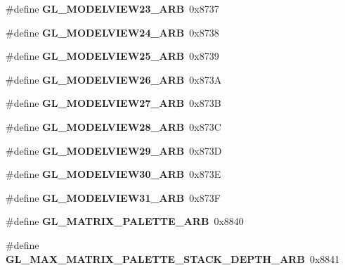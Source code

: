 \begin{DoxyCompactItemize}
\item 
\#define {\bfseries G\+L\+\_\+\+M\+O\+D\+E\+L\+V\+I\+E\+W23\+\_\+\+A\+R\+B}~0x8737\label{_s_d_l__opengl_8h_ae8cd306e49a5b92831d43f1c62419ae6}

\item 
\#define {\bfseries G\+L\+\_\+\+M\+O\+D\+E\+L\+V\+I\+E\+W24\+\_\+\+A\+R\+B}~0x8738\label{_s_d_l__opengl_8h_ae244b71b4055a0fd37b5674ae193839d}

\item 
\#define {\bfseries G\+L\+\_\+\+M\+O\+D\+E\+L\+V\+I\+E\+W25\+\_\+\+A\+R\+B}~0x8739\label{_s_d_l__opengl_8h_aabe837230691b8591dd75ac20647f666}

\item 
\#define {\bfseries G\+L\+\_\+\+M\+O\+D\+E\+L\+V\+I\+E\+W26\+\_\+\+A\+R\+B}~0x873\+A\label{_s_d_l__opengl_8h_a61065a2d525b87aa4fa95f4263b9eb00}

\item 
\#define {\bfseries G\+L\+\_\+\+M\+O\+D\+E\+L\+V\+I\+E\+W27\+\_\+\+A\+R\+B}~0x873\+B\label{_s_d_l__opengl_8h_aed581914d18b35d1630797eed90a7fa4}

\item 
\#define {\bfseries G\+L\+\_\+\+M\+O\+D\+E\+L\+V\+I\+E\+W28\+\_\+\+A\+R\+B}~0x873\+C\label{_s_d_l__opengl_8h_a926aca92e40048ee41f33944599d5f44}

\item 
\#define {\bfseries G\+L\+\_\+\+M\+O\+D\+E\+L\+V\+I\+E\+W29\+\_\+\+A\+R\+B}~0x873\+D\label{_s_d_l__opengl_8h_afd4038cab11b535dc3821001c90daf54}

\item 
\#define {\bfseries G\+L\+\_\+\+M\+O\+D\+E\+L\+V\+I\+E\+W30\+\_\+\+A\+R\+B}~0x873\+E\label{_s_d_l__opengl_8h_a94c34679eb56f659baae85a5f2367510}

\item 
\#define {\bfseries G\+L\+\_\+\+M\+O\+D\+E\+L\+V\+I\+E\+W31\+\_\+\+A\+R\+B}~0x873\+F\label{_s_d_l__opengl_8h_ac165b6ee5baea631c49d2f47f316a4dd}

\item 
\#define {\bfseries G\+L\+\_\+\+M\+A\+T\+R\+I\+X\+\_\+\+P\+A\+L\+E\+T\+T\+E\+\_\+\+A\+R\+B}~0x8840\label{_s_d_l__opengl_8h_a60f4d635bf46bc2ab0f5b38449ad0ae7}

\item 
\#define {\bfseries G\+L\+\_\+\+M\+A\+X\+\_\+\+M\+A\+T\+R\+I\+X\+\_\+\+P\+A\+L\+E\+T\+T\+E\+\_\+\+S\+T\+A\+C\+K\+\_\+\+D\+E\+P\+T\+H\+\_\+\+A\+R\+B}~0x8841\label{_s_d_l__opengl_8h_aee717060b28f0bc74f16df3a87808eec}


\end{DoxyCompactItemize}
